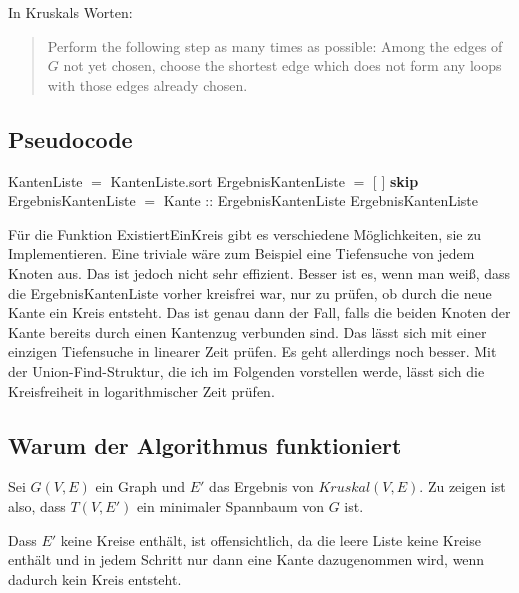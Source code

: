 In Kruskals Worten: 
\begin{quotation}
  Perform the following step as many times as possible: Among the edges of $G$ not yet chosen, choose the shortest edge which does not form any loops with those edges already chosen.\cite{kruskal_article}
\end{quotation}

\subsection{Pseudocode}
\begin{algorithmic}
    \State KantenListe $=$ KantenListe.sort
    \State ErgebnisKantenListe $=$ [ ]
        \State \textbf{skip}
      \Else
        \State ErgebnisKantenListe $=$ Kante :: ErgebnisKantenListe
      \EndIf
    \EndFor
    \State \Return ErgebnisKantenListe
  \EndFunction
\end{algorithmic}
Für die Funktion ExistiertEinKreis gibt es verschiedene Möglichkeiten, sie zu Implementieren. Eine triviale wäre zum Beispiel eine Tiefensuche von jedem Knoten aus.
Das ist jedoch nicht sehr effizient. Besser ist es, wenn man weiß, dass die ErgebnisKantenListe vorher kreisfrei war, nur zu prüfen, ob durch die neue Kante ein Kreis entsteht.
Das ist genau dann der Fall, falls die beiden Knoten der Kante bereits durch einen Kantenzug verbunden sind. Das lässt sich mit einer einzigen Tiefensuche in linearer Zeit prüfen.
Es geht allerdings noch besser. Mit der Union-Find-Struktur, die ich im Folgenden vorstellen werde, lässt sich die Kreisfreiheit in logarithmischer Zeit prüfen.

\subsection{Warum der Algorithmus funktioniert}
Sei $G(V, E)$ ein Graph und $E'$ das Ergebnis von $Kruskal(V, E)$. Zu zeigen ist also, dass $T(V, E')$ ein minimaler Spannbaum von $G$ ist.

Dass $E'$ keine Kreise enthält, ist offensichtlich, da die leere Liste keine Kreise enthält und in jedem Schritt nur dann eine Kante dazugenommen wird, wenn dadurch kein Kreis entsteht.

